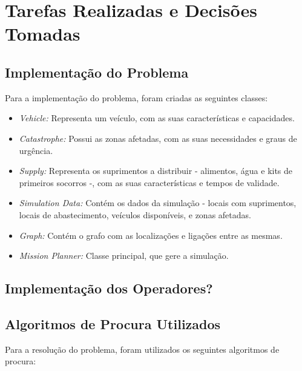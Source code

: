 \documentclass[a4paper,12pt]{scrreprt}
\begin{document}

\chapter{Tarefas Realizadas e Decisões Tomadas}

\section{Implementação do Problema}

Para a implementação do problema, foram criadas as seguintes classes:

\begin{itemize}
    \item \textit{Vehicle:} Representa um veículo, com as suas características e capacidades.
    \item \textit{Catastrophe:} Possui as zonas afetadas, com as suas necessidades e graus de urgência.
    \item \textit{Supply:} Representa os suprimentos a distribuir - alimentos, água e kits de primeiros socorros -,
    com as suas características e tempos de validade.
    \item \textit{Simulation Data:} Contém os dados da simulação - locais com suprimentos, locais de abastecimento,
    veículos disponíveis, e zonas afetadas.
    \item \textit{Graph:} Contém o grafo com as localizações e ligações entre as mesmas.
    \item \textit{Mission Planner:} Classe principal, que gere a simulação.
\end{itemize}

\section{Implementação dos Operadores?}

\section{Algoritmos de Procura Utilizados}

Para a resolução do problema, foram utilizados os seguintes algoritmos de procura:
\end{document}
